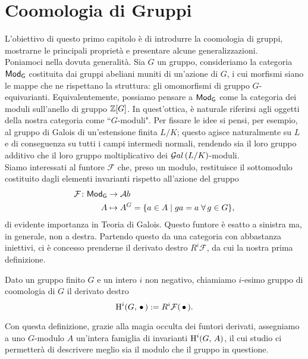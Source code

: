 \chapter{Coomologia di Gruppi}


L'obiettivo di questo primo capitolo è di introdurre la coomologia di gruppi, mostrarne le principali proprietà e presentare alcune generalizzazioni.\\

Poniamoci nella dovuta generalità. Sia $ G $ un gruppo, consideriamo la categoria $ \mathsf{Mod}_\mathsf{G} $ costituita dai gruppi abeliani muniti di un'azione di $ G $, i cui morfismi siano le mappe che ne rispettano la struttura: gli omomorfismi di gruppo $ G $-equivarianti. Equivalentemente, possiamo pensare a $ \mathsf{Mod}_\mathsf{G} $ come la categoria dei moduli sull'anello di gruppo $ \mathbb{Z}[G] $. In quest'ottica, è naturale riferirsi agli oggetti della nostra categoria come \textquotedblleft$ G $-moduli".
Per fissare le idee si pensi, per esempio, al gruppo di Galois di un'estensione finita $ L/K $; questo agisce naturalmente su $ L $ e di conseguenza su tutti i campi intermedi normali, rendendo sia il loro gruppo additivo che il loro gruppo moltiplicativo dei $ \mathcal{G}al\left( L/K \right) $-moduli. \\

Siamo interessati al funtore $ \mathcal{F} $ che, preso un modulo, restituisce il sottomodulo costituito dagli elementi invarianti rispetto all'azione del gruppo
\begin{align*} 
\mathcal{F} \colon \mathsf{Mod}_\mathsf{G} &\to \mathcal{A}b \\
A &\mapsto A^G = \{ a \in A \mid ga = a \; \forall \, g \in G \},
\end{align*}
di evidente importanza in Teoria di Galois. Questo funtore è esatto a sinistra ma, in generale, non a destra. Partendo questo da una categoria con abbastanza iniettivi, ci è concesso prenderne il derivato destro $ R^i\mathcal{F} $, da cui la nostra prima definizione.

\begin{definition}
	Dato un gruppo finito $ G $ e un intero $ i $ non negativo, chiamiamo $ i $-esimo gruppo di coomologia di $ G $ il derivato destro
	\[ \operatorname{H}^i(G, \, \bullet\,) : = R^i\mathcal{F}(\,\bullet\,). \]
\end{definition}

Con questa definizione, grazie alla magia occulta dei funtori derivati, assegniamo a uno $ G $-modulo $ A $ un'intera famiglia di invarianti $ \operatorname{H}^i(G, \, A) $, il cui studio ci permetterà di descrivere meglio sia il modulo che il gruppo in questione. 

